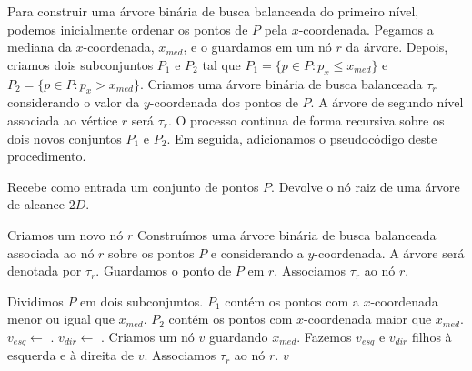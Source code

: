 Para construir uma árvore binária de busca balanceada do primeiro nível, podemos inicialmente ordenar os pontos de $P$ pela %
$x$-coordenada. %
Pegamos a mediana da $x$-coordenada, $x_{med}$, e o guardamos em um nó $r$ da árvore. Depois, criamos dois subconjuntos $P_1$ e $P_2$ tal que $P_1 = \{p \in P : p_x \leq x_{med}\}$ e $P_2 = \{p \in P : p_x > x_{med}\}$. Criamos uma árvore binária de busca balanceada $\tau_r$ considerando o valor da $y$-coordenada dos pontos de $P$. A árvore de segundo nível associada ao vértice $r$ será $\tau_r$. O processo continua de forma recursiva sobre os dois novos conjuntos $P_1$ e $P_2$. Em seguida, adicionamos o pseudocódigo deste procedimento.

\begin{algorithm}[h!]
    \caption{Recebe como entrada um conjunto de pontos $P$. Devolve o nó raiz de uma árvore de alcance $2D$.}
    \begin{algorithmic}[1]
    \State Criamos um novo nó $r$
        \State Construímos uma árvore binária de busca balanceada associada ao nó $r$ sobre os pontos $P$ e considerando a $y$-coordenada. A árvore será denotada por $\tau_r$.%
            \State Guardamos o ponto de $P$ em $r$.
            \State Associamos $\tau_r$ ao nó $r$. %
            
        \Else
            \State Dividimos $P$ em dois subconjuntos. 
            \State $P_1$ contém os pontos com a $x$-coordenada menor ou igual que $x_{med}$.
            \State $P_2$ contém os pontos com $x$-coordenada maior que $x_{med}$.
            \State $v_{esq} \leftarrow $ .
            \State $v_{dir} \leftarrow $ .
            \State Criamos um nó $v$ guardando $x_{med}$.
            \State Fazemos $v_{esq}$ e $v_{dir}$ filhos à esquerda e à direita de $v$.
            \State Associamos $\tau_{r}$ ao nó $r$.
        \EndIf
    \State\Return $v$
    \EndFunction
    \end{algorithmic}
\end{algorithm}


